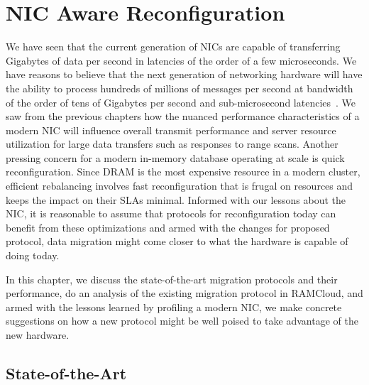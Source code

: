 
\chapter{NIC Aware Reconfiguration}
\label{chap:migration}
We have seen that the current generation of NICs are capable of transferring Gigabytes of 
data per second in latencies of the order of a few microseconds. We have reasons to believe 
that the next generation of networking hardware will have the ability to process 
hundreds of millions of messages per second at bandwidth of the order of tens of Gigabytes per 
second and sub-microsecond latencies~\cite{cx6}.
We saw from the previous chapters how the nuanced performance characteristics of 
a modern NIC will influence overall transmit performance and server resource utilization 
for large data transfers such as responses to range scans. Another pressing 
concern for a modern in-memory database operating at scale is quick reconfiguration. 
Since DRAM is the most expensive resource in a modern cluster, efficient rebalancing 
involves fast reconfiguration that is frugal on resources and keeps the impact on their 
SLAs minimal. Informed with our lessons about the NIC, it is reasonable to assume that protocols for reconfiguration 
today can benefit from these optimizations and armed with the changes for proposed protocol, data migration might come 
closer to what the hardware is capable of doing today.

In this chapter, we discuss the state-of-the-art migration protocols and their 
performance, do an analysis of the existing migration protocol in RAMCloud, 
and armed with the lessons learned by profiling a modern NIC, we make concrete 
suggestions on how a new protocol might be well poised to take advantage of the 
new hardware.
\section{State-of-the-Art}


